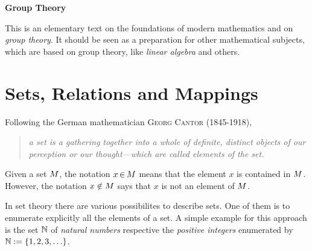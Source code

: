\documentclass[11pt,twoside]{article}
\begin{document}
\thispagestyle{empty}

\def\Title{Group Theory}

\centerline{\large{\textbf{\Title}}}
\vspace{4pt}
\centerline{\small{\textsc{\Author}}}
\vspace{10pt}

\fancyhead[OL]{\small{\thepage}}
\fancyhead[ER]{\small{\thepage}}
\fancyhead[OC] {\small{\textsc{\Title}}}



This is an elementary text on the foundations of modern mathematics and
on \textit{group theory}.
It should be seen as a preparation for other mathematical
subjects, which are based on group theory,
like \textit{linear algebra} and others.

\part{Sets, Relations and Mappings}                                            %
Following the German mathematician \textsc{Georg Cantor} (1845-1918),
\begin{quotation}
\textit{
a set is a gathering together into a whole of definite, distinct objects
of our perception or our thought—which are called elements of the set.
}
\end{quotation}

\subparagraph{}
Given a set $M$,
the notation $x {\,\in\,} M$ means
that the element $x$ is contained in $M$.
However,
the notation $x \notin M$ says
that $x$ is not an element of $M$.

\subparagraph{}
In set theory there are various possibilites to describe sets. 
One of them is to enumerate explicitly all the elements of a set.
A simple example for this approach is the set ${\mathbb{N}}$ of \textit{natural numbers}
respective the \textit{positive integers}
enumerated by ${\mathbb{N}} := \{1,2,3,\ldots\}$.
\end{document}
